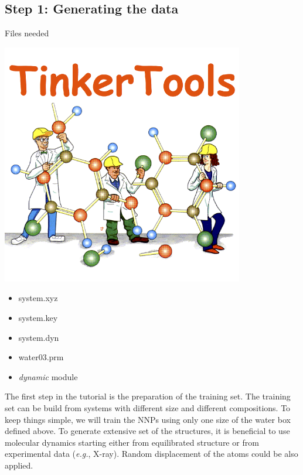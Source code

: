 \documentclass[12pt]{article}
\begin{document}
\subsection{Step 1: Generating the data}
\begin{mybox2}{{Files needed}}
\begin{minipage}[c]{0.5\linewidth}
\includegraphics[scale=0.2]{tinker.png}
\end{minipage}
\begin{minipage}[c]{0.5\linewidth}
\begin{itemize}
    \item system.xyz
    \item system.key
    \item system.dyn
    \item water03.prm
    \item \textit{dynamic} module
\end{itemize}
\end{minipage}
\end{mybox2}
The first step in the tutorial is the preparation of the training set. The training set can be build from systems with different size and different compositions. To keep things simple, we will train the NNPs using only one size of the water box defined above. To generate extensive set of the structures, it is beneficial to use molecular dynamics starting either from equilibrated structure or from experimental data (\textit{e.g.}, X-ray). Random displacement of the atoms could be also applied.
\end{document}
